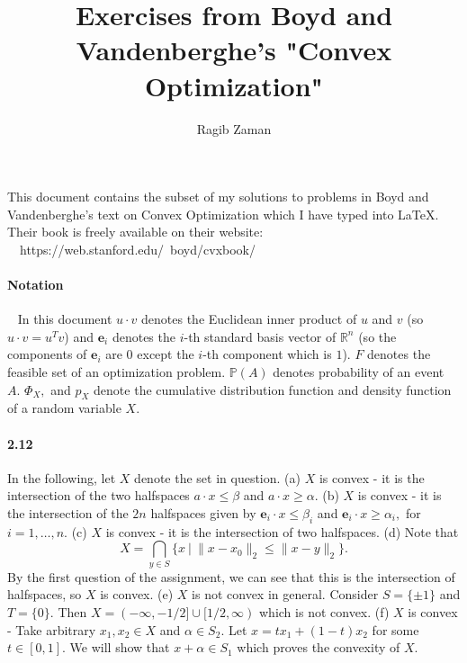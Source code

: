 \documentclass[a4paper,12pt]{article}
\title{Exercises from Boyd and Vandenberghe's "Convex Optimization"}
\author{Ragib Zaman}
\newcommand{\e}{\mathbf{e}}
\begin{document}
\maketitle

This document contains the subset of my solutions to problems in Boyd and Vandenberghe's text on Convex Optimization which I have typed into LaTeX. Their book is freely available on their website: \\
\
\ https://web.stanford.edu/~boyd/cvxbook/

\paragraph{Notation}
\
\newline
In this document $u\cdot v$ denotes the Euclidean inner product of $u$ and $v$ (so $u\cdot v = u^Tv$) and $\e_i$ denotes the $i$-th standard basis vector of $\mathbb{R}^n$ (so the components of $\e_i$ are $0$ except the $i$-th component which is $1$). $F$ denotes the feasible set of an optimization problem. $\mathbb{P}(A)$ denotes probability of an event $A.$ $\Phi_X,$ and  $p_X$ denote the cumulative distribution function and density function of a random variable $X.$



\paragraph*{2.12}
In the following, let $X$ denote the set in question.
\newline
(a) $X$ is convex - it is the intersection of the two halfspaces $a\cdot x \leq \beta$ and $a\cdot x \geq \alpha.$ 
\newline
(b) $X$ is convex - it is the intersection of the $2n$ halfspaces given by $\e_i\cdot x \leq \beta_i$ and $\e_i \cdot x \geq \alpha_i,$ for $i=1,\ldots, n.$ 
\newline
(c) $X$ is convex - it is the intersection of two halfspaces.
\newline
(d) Note that $$X = \bigcap_{y\in S} \{ x \ | \ \|x-x_0\|_2 \leq \| x - y \|_2 \}.$$
By the first question of the assignment, we can see that this is the intersection of halfspaces, so $X$ is convex. 
\newline
(e) $X$ is not convex in general. Consider $S = \{ \pm 1\}$ and $T=\{ 0\}.$ Then $X = (-\infty, -1/2] \cup [1/2, \infty)$ which is not convex.
\newline
(f) $X$ is convex - Take arbitrary $x_1, x_2\in X$ and $\alpha \in S_2.$ Let $x = tx_1 + (1-t)x_2$ for some $t\in [0,1].$ We will show that $x + \alpha \in S_1$ which proves the convexity of $X.$ 
\end{document}
